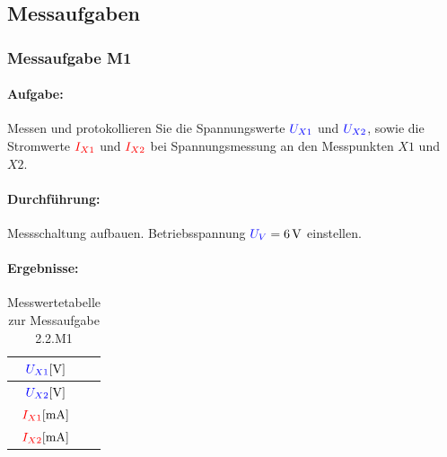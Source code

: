 \documentclass[11pt,a4paper,titlepage,parskip=half]{scrreprt}
\begin{document}
        \subsection{Messaufgaben}
            \subsubsection{Messaufgabe M1}
            \paragraph{Aufgabe:} Messen und protokollieren Sie die Spannungswerte $\textcolor{blue}{U_{X1}}$ und $\textcolor{blue}{U_{X2}}$, sowie die Stromwerte $\textcolor{red}{I_{X1}}$ und $\textcolor{red}{I_{X2}}$ bei Spannungsmessung an den Messpunkten $X1$ und $X2$. 
        
            \paragraph{Durchführung:} Messschaltung aufbauen. Betriebsspannung $\textcolor{blue}{U_V} = \SI{6}{\volt}$ einstellen.
            \paragraph{Ergebnisse:}
                 \begin{center}
                    \begin{table}[H]
                        \caption{Messwertetabelle zur Messaufgabe 2.2.M1}
                        \label{tbl:messergebnisse2.1}
                        \renewcommand{\arraystretch}{1.6}
                        \begin{center}
                            \begin{tabular}{c|c}
                                $\textcolor{blue}{U_{X1}} [\si{\volt}]$ & \qquad\qquad\qquad\\\hline
                                $\textcolor{blue}{U_{X2}} [\si{\volt}]$ & \qquad\qquad\qquad\\ \hline
                                $\textcolor{red}{I_{X1}} [\si{\milli\ampere}]$ & \qquad\qquad\qquad\\\hline
                                $\textcolor{red}{I_{X2}} [\si{\milli\ampere}]$ & \qquad\qquad\qquad
                            \end{tabular}
                        \end{center}
                    \end{table}
                \end{center}
            
\end{document}

